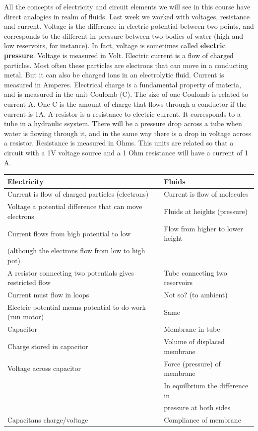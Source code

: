 \documentclass[a4paper]{scrartcl}
\begin{document}
   All the concepts of electricity and circuit elements we will see in this course have direct analogies in realm of fluids. Last week we worked with voltages, resistance and current. Voltage is the difference in electric potential between two points, and corresponds to the different in pressure between two bodies of water (high and low reservoirs, for instance). In fact, voltage is sometimes called \textbf{electric pressure}. Voltage is measured in Volt. 
   Electric current is a flow of charged particles. Most often these particles are electrons that can move in a conducting metal. But it can also be charged ions in an electrolytic fluid. Current is measured in Amperes. Electrical charge is a fundamental property of materia, and is measured in the unit Coulomb (C). The size of one Coulomb is related to current A. One C is the amount of charge that flows through a conductor if the current is 1A. 
A resistor is a resistance to electric current. It corresponds to a tube in a hydraulic ssystem.   There will be a pressure drop across a tube when water is flowing through it, and in the same way there is a drop in voltage across a resistor. Resistance is measured in Ohms. This units are related so that a circuit with a 1V voltage source and a 1 Ohm resistance will have a current of 1 A.

\begin{center}
\begin{tabular}{ll}
Electricity & Fluids\\
\hline
Current is flow of charged particles (electrons) & Current is flow of molecules\\
Voltage a potential difference that can move electrons & Fluids at  heights (pressure)\\
Current flows from high potential to low & Flow from higher to lower height\\
(although the electrons flow from low to high pot) & \\
A resistor connecting two potentials gives restricted flow & Tube connecting two reservoirs\\
Current must flow in loops & Not so? (to ambient)\\
Electric potential means potential to do work (run motor) & Same\\
Capacitor & Membrane in tube\\
Charge stored in capacitor & Volume of displaced membrane\\
Voltage across capacitor & Force (pressure) of membrane\\
 & In equilbrium the difference in\\
 & pressure at both sides\\
Capacitans charge/voltage & Compliance of membrane\\
\end{tabular}
\end{center}
\end{document}
